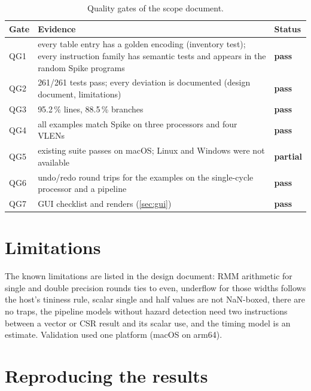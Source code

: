 \documentclass[11pt]{article}
\newcommand{\pass}{\textcolor{kstretch}{\textsf{\textbf{pass}}}}
\newcommand{\partly}{\textcolor{kshould}{\textsf{\textbf{partial}}}}
\begin{document}
\begin{table}[H]
\centering\small
\caption{Quality gates of the scope document.}\label{tab:gates}
\begin{tabularx}{\textwidth}{@{}L{1.0cm}YL{1.4cm}@{}}
\toprule
Gate & Evidence & Status \\
\midrule
QG1 & every table entry has a golden encoding (inventory test); every instruction family has semantic tests and appears in the random Spike programs & \pass \\
QG2 & 261/261 tests pass; every deviation is documented (design document, limitations) & \pass \\
QG3 & 95.2\,\% lines, 88.5\,\% branches & \pass \\
QG4 & all examples match Spike on three processors and four VLENs & \pass \\
QG5 & existing suite passes on macOS; Linux and Windows were not available & \partly \\
QG6 & undo/redo round trips for the examples on the single-cycle processor and a pipeline & \pass \\
QG7 & GUI checklist and renders (\cref{sec:gui}) & \pass \\
\bottomrule
\end{tabularx}
\end{table}

\section{Limitations}\label{sec:limits}

The known limitations are listed in the design document: RMM arithmetic for single and double
precision rounds ties to even, underflow for those widths follows the host's tininess rule,
scalar single and half values are not NaN-boxed, there are no traps, the pipeline models without
hazard detection need two instructions between a vector or CSR result and its scalar use, and
the timing model is an estimate. Validation used one platform (macOS on arm64).

\section{Reproducing the results}\label{sec:repro}
\end{document}
